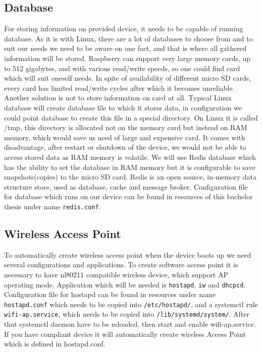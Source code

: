 \subsection{Database} %
\label{sub:database}
For storing information on provided device, it needs to be capable of running database. As it is with Linux, there are a lot of databases to choose from and to suit our needs we need to be aware on one fact, and that is where all gathered information will be stored. Raspberry can support very large memory cards, up to 512 gigabytes, and with various read/write speeds, so one could find card which will suit oneself needs.\cite{rpi_sd_cards} In spite of availability of different micro SD cards, every card has limited read/write cycles after which it becomes unreliable. Another solution is not to store information on card at all. Typical Linux database will create database file to which it stores data, in configuration we could point database to create this file in a special directory. On Linux it is called /tmp\cite{tmp}, this directory is allocated not on the memory card but instead on RAM memory, which would save us need of large and expensive card. It comes with disadvantage, after restart or shutdown of the device, we would not be able to access stored data as RAM memory is volatile\cite{tmpfs}.
We will use Redis database which has the ability to set the database in RAM memory but it is configurable to save snapshots(copies) to the micro SD card. Redis is an open source, in-memory data structure store, used as database, cache and message broker\cite{redis_doc}. Configuration file for database which runs on our device can be found in resources of this bachelor thesis under name \verb|redis.conf|.
\subsection{Wireless Access Point} %
\label{sub:wireless_access_point}
To automatically create wireless access point when the device boots up we need several configurations and applications. To create software access point it is necessary to have nl80211 compatible wireless device, which support AP operating mode\cite{soft_ap}. Application which will be needed is \verb|hostapd|, \verb|iw| and \verb|dhcpcd|. Configuration file for hostapd can be found in resources under name \verb|hostapd.conf| which needs to be copied into \verb|/etc/hostapd/|, and a systemctl rule \verb|wifi-ap.service|, which needs to be copied into \verb|/lib/systemd/system/|. After that systemctl daemon have to be reloaded, then start and enable wifi-ap.service. If you have compliant device it will automatically create wireless Access Point which is defined in hostapd.conf.
